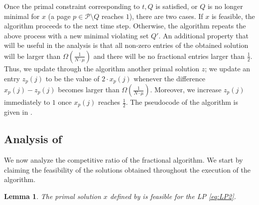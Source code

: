 \documentclass[11pt]{article}
\newcommand{\cP}{{\mathcal{P}}}
\newtheorem{lemma}[thm]{Lemma}
\begin{document}
Once the primal constraint corresponding to $t,Q$ is satisfied, or $Q$ is no longer minimal for $x$ (a page $p \in \cP \setminus Q$ reaches $1$), there are two cases. If $x$ is feasible, the algorithm proceeds to the next time step. Otherwise, the algorithm repeats the above process with a new minimal violating set $Q'$. An additional property that will be useful in the analysis is that all non-zero entries of the obtained solution will be larger than $\Omega\left( \frac{1}{N \cdot \mu}\right)$ and there will be no fractional entries larger than $\frac{1}{2}$. Thus, we update through the algorithm another primal solution $z$; we update an entry $z_p(j)$ to be the value of $2 \cdot x_p(j)$ whenever the difference $x_p(j)-z_p(j)$ becomes larger than  $\Omega\left( \frac{1}{N \cdot \mu}\right)$. Moreover, we increase $z_p(j)$ %
immediately to $1$ once $x_p(j)$ reaches $\frac{1}{2}$. The pseudocode of the algorithm is given in . 

\subsection{Analysis of }

We now analyze the competitive ratio of the fractional algorithm. We start by claiming the feasibility of the solutions obtained throughout the execution of the algorithm. 

	\begin{lemma}
	\label{lem:primalX}
	The primal solution $x$ defined by 	 is feasible for the \textnormal{LP} \eqref{eq:LP2}. 
\end{lemma}
\end{document}
